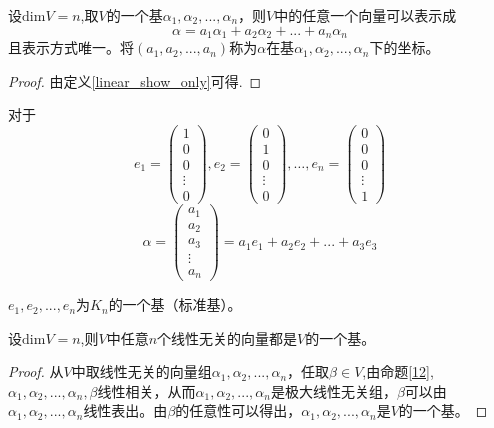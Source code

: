 \documentclass[blue,normal,cn]{elegantnote}
\begin{document}
\begin{definition}
    设$\mathrm{dim} V=n$,取$V$的一个基$α_1,α_2,...,α_n$，则$V$中的任意一个向量可以表示成
    \begin{equation*}
        α=a_1 α_1+a_2  α_2+...+a_n  α_n
    \end{equation*}
    且表示方式唯一。将$(a_1,a_2,...,a_n)$称为$α$在基$α_1,α_2,...,α_n$下的坐标。
\end{definition}

\begin{proof}
    由定义\ref{linear_show_only}可得.
\end{proof}

对于
\begin{equation*}
     e_1=\begin{pmatrix} 
            1\\
            0\\
            0\\
            \vdots\\
            0
         \end{pmatrix}
         ,e_2=\begin{pmatrix} 
                0\\
                1\\
                0\\
                \vdots\\
                0
            \end{pmatrix}
            ,\dots
        ,e_n=\begin{pmatrix} 
            0\\
            0\\
            0\\
            \vdots\\
            1
         \end{pmatrix}
\end{equation*}
\begin{equation*}
    α=\begin{pmatrix} 
        a_1\\
        a_2\\
        a_3\\
        \vdots\\
        a_n
     \end{pmatrix}
     =a_1e_1+a_2e_2+...+a_3e_3
\end{equation*}

$e_1,e_2,...,e_n$为$K_n$的一个基（标准基）。

\begin{proposition}
    设$\mathrm{dim} V=n$,则$V$中任意$n$个线性无关的向量都是$V$的一个基。
\end{proposition}

\begin{proof}
    从$V$中取线性无关的向量组$α_1,α_2,...,α_n$，任取$\beta \in V$,由命题\ref{12},$α_1,α_2,...,α_n,\beta$线性相关，从而$α_1,α_2,...,α_n$是极大线性无关组，$\beta$可以由$α_1,α_2,...,α_n$线性表出。由$\beta$的任意性可以得出，$α_1,α_2,...,α_n$是$V$的一个基。
\end{proof}
\end{document}
